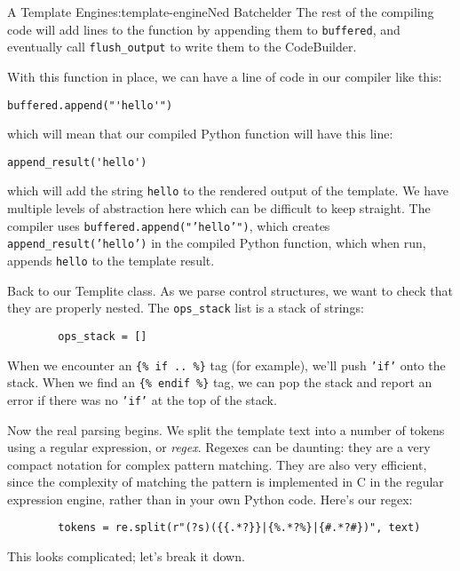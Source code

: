 \begin{aosachapter}{A Template Engine}{s:template-engine}{Ned Batchelder}
The rest of the compiling code will add lines to the function by
appending them to \texttt{buffered}, and eventually call
\texttt{flush\_output} to write them to the CodeBuilder.

With this function in place, we can have a line of code in our compiler
like this:

\begin{verbatim}
buffered.append("'hello'")
\end{verbatim}

which will mean that our compiled Python function will have this line:

\begin{verbatim}
append_result('hello')
\end{verbatim}

which will add the string \texttt{hello} to the rendered output of the
template. We have multiple levels of abstraction here which can be
difficult to keep straight. The compiler uses
\texttt{buffered.append("'hello'")}, which creates
\texttt{append\_result('hello')} in the compiled Python function, which
when run, appends \texttt{hello} to the template result.

Back to our Templite class. As we parse control structures, we want to
check that they are properly nested. The \texttt{ops\_stack} list is a
stack of strings:

\begin{verbatim}
        ops_stack = []
\end{verbatim}

When we encounter an \texttt{\{\% if .. \%\}} tag (for example), we'll
push \texttt{'if'} onto the stack. When we find an
\texttt{\{\% endif \%\}} tag, we can pop the stack and report an error
if there was no \texttt{'if'} at the top of the stack.

Now the real parsing begins. We split the template text into a number of
tokens using a regular expression, or \emph{regex}. Regexes can be
daunting: they are a very compact notation for complex pattern matching.
They are also very efficient, since the complexity of matching the
pattern is implemented in C in the regular expression engine, rather
than in your own Python code. Here's our regex:

\begin{verbatim}
        tokens = re.split(r"(?s)({{.*?}}|{%.*?%}|{#.*?#})", text)
\end{verbatim}

This looks complicated; let's break it down.


\end{aosachapter}
